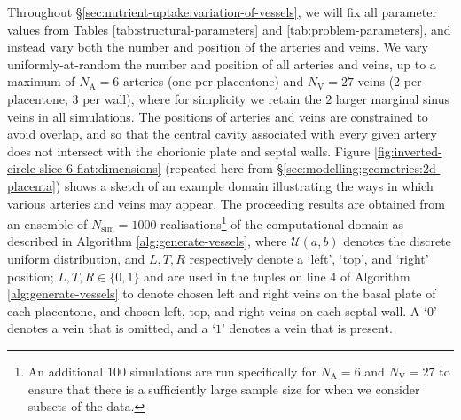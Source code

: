         Throughout \S\ref{sec:nutrient-uptake:variation-of-vessels}, we will fix all parameter values from Tables \ref{tab:structural-parameters} and \ref{tab:problem-parameters}, and instead vary both the number and position of the arteries and veins. We vary uniformly-at-random the number and position of all arteries and veins, up to a maximum of $N_\text{A} = 6$ arteries (one per placentone) and $N_\text{V} = 27$ veins (2 per placentone, 3 per wall), where for simplicity we retain the $2$ larger marginal sinus veins in all simulations. The positions of arteries and veins are constrained to avoid overlap, and so that the central cavity associated with every given artery does not intersect with the chorionic plate and septal walls. Figure \ref{fig:inverted-circle-slice-6-flat:dimensions} (repeated here from \S\ref{sec:modelling:geometries:2d-placenta}) shows a sketch of an example domain illustrating the ways in which various arteries and veins may appear. The proceeding results are obtained from an ensemble of $N_\text{sim} = 1000$ realisations\footnote{An additional $100$ simulations are run specifically for $N_\text{A} = 6$ and $N_\text{V} = 27$ to ensure that there is a sufficiently large sample size for when we consider subsets of the data.} of the computational domain as described in Algorithm \ref{alg:generate-vessels}, where $\mathcal{U}(a, b)$ denotes the discrete uniform distribution, and $L, T, R$ respectively denote a `left', `top', and `right' position; $L,T,R \in \{0, 1\}$ and are used in the tuples on line 4 of Algorithm \ref{alg:generate-vessels} to denote chosen left and right veins on the basal plate of each placentone, and chosen left, top, and right veins on each septal wall. A `$0$' denotes a vein that is omitted, and a `$1$' denotes a vein that is present.

